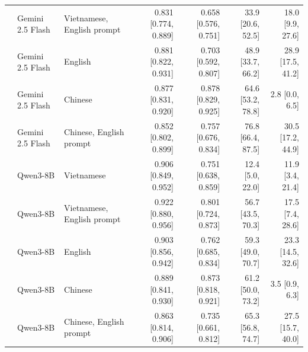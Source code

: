 \begin{tabular}{lllrrrr}
 & Gemini 2.5 Flash & Vietnamese, English prompt & 0.831 [0.774, 0.889] & 0.658 [0.576, 0.751] & 33.9 [20.6, 52.5] & 18.0 [9.9, 27.6] \\
 & Gemini 2.5 Flash & English & 0.881 [0.822, 0.931] & 0.703 [0.592, 0.807] & 48.9 [33.7, 66.2] & 28.9 [17.5, 41.2] \\
 & Gemini 2.5 Flash & Chinese & 0.877 [0.831, 0.920] & 0.878 [0.829, 0.925] & 64.6 [53.2, 78.8] & 2.8 [0.0, 6.5] \\
 & Gemini 2.5 Flash & Chinese, English prompt & 0.852 [0.802, 0.899] & 0.757 [0.676, 0.834] & 76.8 [66.4, 87.5] & 30.5 [17.2, 44.9] \\
 & Qwen3-8B & Vietnamese & 0.906 [0.849, 0.952] & 0.751 [0.638, 0.859] & 12.4 [5.0, 22.0] & 11.9 [3.4, 21.4] \\
 & Qwen3-8B & Vietnamese, English prompt & 0.922 [0.880, 0.956] & 0.801 [0.724, 0.873] & 56.7 [43.5, 70.3] & 17.5 [7.4, 28.6] \\
 & Qwen3-8B & English & 0.903 [0.856, 0.942] & 0.762 [0.685, 0.834] & 59.3 [49.0, 70.7] & 23.3 [14.5, 32.6] \\
 & Qwen3-8B & Chinese & 0.889 [0.841, 0.930] & 0.873 [0.818, 0.921] & 61.2 [50.0, 73.2] & 3.5 [0.9, 6.3] \\
 & Qwen3-8B & Chinese, English prompt & 0.863 [0.814, 0.906] & 0.735 [0.661, 0.812] & 65.3 [56.8, 74.7] & 27.5 [15.7, 40.0] \\
\bottomrule
\end{tabular}
